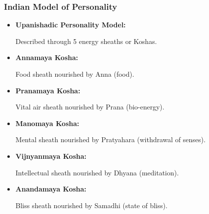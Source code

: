 \begin{frame}[fragile]\frametitle{Indian Model of Personality}

      \begin{itemize}
        \item \textbf{Upanishadic Personality Model:}
        
        Described through 5 energy sheaths or Koshas.
        
        \item \textbf{Annamaya Kosha:} 
        
        Food sheath nourished by Anna (food).
        
        \item \textbf{Pranamaya Kosha:}
        
        Vital air sheath nourished by Prana (bio-energy).
        
        \item \textbf{Manomaya Kosha:}
        
        Mental sheath nourished by Pratyahara (withdrawal of senses).
        
        \item \textbf{Vijnyanmaya Kosha:}
        
        Intellectual sheath nourished by Dhyana (meditation).
        
        \item \textbf{Anandamaya Kosha:}
        
        Bliss sheath nourished by Samadhi (state of bliss).
        
      \end{itemize}

\end{frame}

